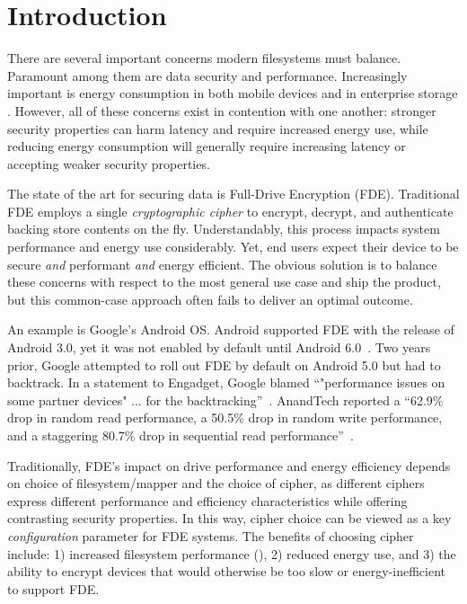 \section{Introduction}\label{sec:introduction}

There are several important concerns modern filesystems must balance. Paramount
among them are data security and performance. Increasingly important is energy
consumption in both mobile devices \cite{android-M-mobile-motivation} and in
enterprise storage \cite{enterprise-motivation}. However, all of these concerns
exist in contention with one another: stronger security properties can harm
latency and require increased energy use, while reducing energy consumption will
generally require increasing latency or accepting weaker security properties.

The state of the art for securing data is Full-Drive Encryption (FDE).
Traditional FDE employs a single \emph{cryptographic cipher} to encrypt,
decrypt, and authenticate backing store contents on the fly. Understandably,
this process impacts system performance and energy use considerably. Yet, end
users expect their device to be secure \emph{and} performant \emph{and} energy
efficient. The obvious solution is to balance these concerns with respect to the
most general use case and ship the product, but this common-case approach often
fails to deliver an optimal outcome.

An example is Google's Android OS. Android supported FDE with the release of
Android 3.0, yet it was not enabled by default until Android
6.0~\cite{android-M-mobile-motivation}. Two years prior, Google attempted to
roll out FDE by default on Android 5.0 but had to backtrack. In a statement to
Engadget, Google blamed ``"performance issues on some partner devices" ... for
the backtracking''~\cite{google-engadget}. AnandTech reported a ``62.9\% drop in
random read performance, a 50.5\% drop in random write performance, and a
staggering 80.7\% drop in sequential read
performance''~\cite{android-M-mobile-motivation-2}.

Traditionally, FDE's impact on drive performance and energy efficiency depends
on choice of filesystem/mapper and the choice of cipher, as different ciphers
express different performance and efficiency characteristics while offering
contrasting security properties. In this way, cipher choice can be viewed as a
key \emph{configuration} parameter for FDE systems. The benefits of choosing
cipher include: 1) increased filesystem performance (), 2) reduced energy use, and 3) the ability to encrypt devices that
would otherwise be too slow or energy-inefficient to support FDE.

